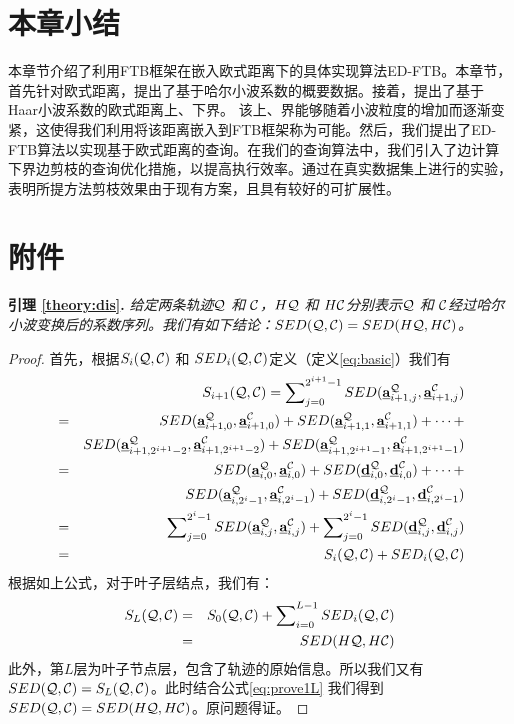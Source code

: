 \section{本章小结}\label{sec-c4-conclusion}
本章节介绍了利用FTB框架在嵌入欧式距离下的具体实现算法ED-FTB。本章节，首先针对欧式距离，提出了基于哈尔小波系数的概要数据。接着，提出了基于Haar小波系数的欧式距离上、下界。
该上、界能够随着小波粒度的增加而逐渐变紧，这使得我们利用将该距离嵌入到FTB框架称为可能。然后，我们提出了ED-FTB算法以实现基于欧式距离的查询。在我们的查询算法中，我们引入了边计算下界边剪枝的查询优化措施，以提高执行效率。通过在真实数据集上进行的实验，表明所提方法剪枝效果由于现有方案，且具有较好的可扩展性。

\section{附件}\label{sec-c4-Appendix}
\textbf{引理 \ref{theory:dis}. }{\em 给定两条轨迹${\cal Q}$ 和 ${\cal C}$，$H{\cal Q}$ 和 $H{\cal C}$分别表示${\cal Q}$ 和 ${\cal C}$经过哈尔小波变换后的系数序列。我们有如下结论：$SED({\cal Q},{\cal C})=SED(H{\cal Q},H{\cal C})$。}
\begin{proof}
	首先，根据$S_{i}({\cal Q}, {\cal C})$ 和 $SED_{i}({\cal Q}, {\cal C})$定义（定义\ref{eq:basic}）我们有
	\allowdisplaybreaks
	\begin{eqnarray}
	&&	S_{i+1}({\cal Q}, {\cal C})=\sum\nolimits_{j=0}^{2^{i+1}-1}SED(\emph{{\textbf{a}}}_{i+1,j}^{\cal Q},\emph{{\textbf{a}}}_{i+1,j}^{\cal C}) \nonumber \\
	&=&SED(\emph{{\textbf{a}}}_{i+1,0}^{\cal Q},\emph{{\textbf{a}}}_{i+1,0}^{\cal C}) + SED(\emph{{\textbf{a}}}_{i+1,1}^{\cal Q},\emph{{\textbf{a}}}_{i+1,1}^{\cal C}) + \cdots + \nonumber \\
	&\,& SED(\emph{{\textbf{a}}}_{i+1,2^{i+1}-2}^{\cal Q},\emph{{\textbf{a}}}_{i+1,2^{i+1}-2}^{\cal C}) + 	SED(\emph{{\textbf{a}}}_{i+1,2^{i+1}-1}^{\cal Q},\emph{{\textbf{a}}}_{i+1,2^{i+1}-1}^{\cal C}) \nonumber \\
	&=&SED(\emph{{\textbf{a}}}_{i,0}^{\cal Q},\emph{{\textbf{a}}}_{i,0}^{\cal C})  +   SED(\emph{{\textbf{d}}}_{i,0}^{\cal Q}, \emph{{\textbf{d}}}_{i,0}^{\cal C})   + \cdots+\nonumber \\
	&\,& SED(\emph{{\textbf{a}}}_{i,2^{i}-1}^{\cal Q},\emph{{\textbf{a}}}_{i,2^{i}-1}^{\cal C})  +   SED(\emph{{\textbf{d}}}_{i,2^{i}-1}^{\cal Q}, \emph{{\textbf{d}}}_{i,2^{i}-1}^{\cal C})  \nonumber   \nonumber \\
	&=& \sum\nolimits_{j=0}^{2^i-1}SED(\emph{{\textbf{a}}}_{i,j}^{\cal Q}, \emph{{\textbf{a}}}_{i,j}^{\cal C})+ \sum\nolimits_{j=0}^{2^i-1}SED(\emph{{\textbf{d}}}_{i,j}^{\cal Q}, \emph{{\textbf{d}}}_{i,j}^{\cal C})\nonumber \\
	&=&S_{i}({\cal Q}, {\cal C})+SED_{i}({\cal Q},{\cal C})
	\end{eqnarray}
	\allowdisplaybreaks[4]
根据如上公式，对于叶子层结点，我们有：
	\begin{eqnarray} \label{eq:prove1L}
	S_{L}({\cal Q},{\cal C})&=&S_{0}({\cal Q},{\cal C})+ \sum\nolimits_{i=0}^{L-1}{SED_{i}({\cal Q},{\cal C})} \nonumber \\
	&=& SED(H{\cal Q},H{\cal C})
	\end{eqnarray}
	此外，第$L$层为叶子节点层，包含了轨迹的原始信息。所以我们又有$SED({\cal Q},{\cal C}) = S_{L}({\cal Q},{\cal C})$。此时结合公式\ref{eq:prove1L}
	我们得到 $SED({\cal Q},{\cal C})=SED(H{\cal Q},H{\cal C})$。原问题得证。
\end{proof}
